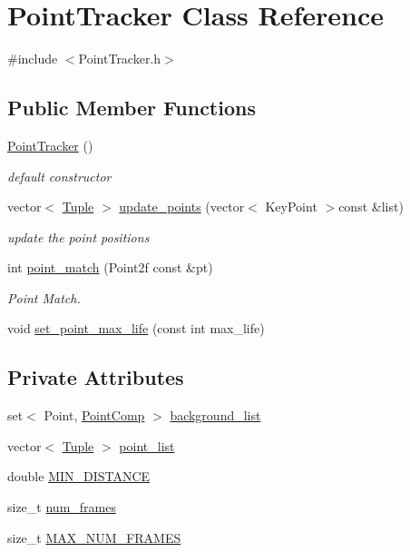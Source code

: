\hypertarget{class_point_tracker}{
\section{\-Point\-Tracker \-Class \-Reference}
\label{class_point_tracker}
}


{\ttfamily \#include $<$\-Point\-Tracker.\-h$>$}

\subsection*{\-Public \-Member \-Functions}
\begin{DoxyCompactItemize}
\item 
\hyperlink{class_point_tracker_a9604754cd19cab5f984e4b861c4049d4}{\-Point\-Tracker} ()
\begin{DoxyCompactList}\small\item\em default constructor \end{DoxyCompactList}\item 
vector$<$ \hyperlink{class_tuple}{\-Tuple} $>$ \hyperlink{class_point_tracker_a48270ad5bc84c22c20d84435f85b63be}{update\-\_\-points} (vector$<$ \-Key\-Point $>$const \&list)
\begin{DoxyCompactList}\small\item\em update the point positions \end{DoxyCompactList}\item 
int \hyperlink{class_point_tracker_ac29873729216df07d202485caaab0f20}{point\-\_\-match} (\-Point2f const \&pt)
\begin{DoxyCompactList}\small\item\em \-Point \-Match. \end{DoxyCompactList}\item 
void \hyperlink{class_point_tracker_a6333fab2cae4b6e140cf99e0159dc5cc}{set\-\_\-point\-\_\-max\-\_\-life} (const int max\-\_\-life)
\end{DoxyCompactItemize}
\subsection*{\-Private \-Attributes}
\begin{DoxyCompactItemize}
\item 
set$<$ \-Point, \hyperlink{struct_point_comp}{\-Point\-Comp} $>$ \hyperlink{class_point_tracker_a7a1f2bb3c992232a04c886cc5bc6c21f}{background\-\_\-list}
\item 
vector$<$ \hyperlink{class_tuple}{\-Tuple} $>$ \hyperlink{class_point_tracker_a3c396dbdf7e00c4cce3b371dd5cddd28}{point\-\_\-list}
\item 
double \hyperlink{class_point_tracker_a3cbc1fe8d39f2c8183654a67f914fa37}{\-M\-I\-N\-\_\-\-D\-I\-S\-T\-A\-N\-C\-E}
\item 
size\-\_\-t \hyperlink{class_point_tracker_aa32e4991c19d192737ae6d5db32a504a}{num\-\_\-frames}
\item 
size\-\_\-t \hyperlink{class_point_tracker_acb445ed3b433172cb10172db77ed702a}{\-M\-A\-X\-\_\-\-N\-U\-M\-\_\-\-F\-R\-A\-M\-E\-S}
\end{DoxyCompactItemize}


